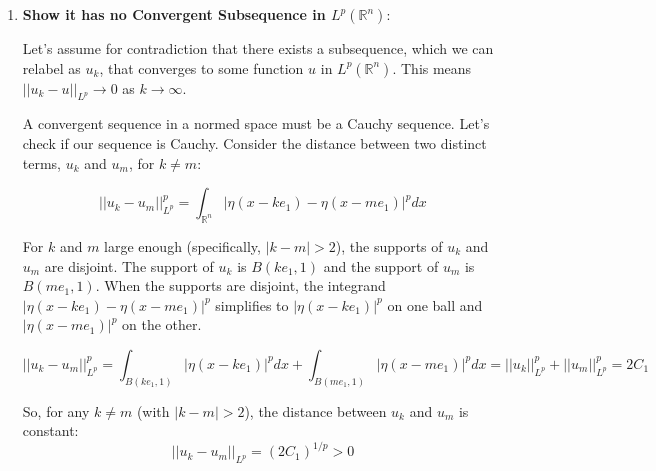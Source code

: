 \documentclass[12pt,a4paper]{report}
\begin{document}
\begin{enumerate}
\begin{enumerate}
\begin{itemize}
    By a simple change of variables $y = x - k e_1$, we see that the norm is independent of the shift:
        $$ ||u_k||_{L^p}^p = \int_{\mathbb{R}^n} |\eta(x - k e_1)|^p dx = \int_{\mathbb{R}^n} |\eta(y)|^p dy = ||\eta||_{L^p}^p $$
        This is a finite constant, let's call it $C_1$.

    \item \textbf{$L^p$ norm of $Du_k$}: 
    
    The derivative is $Du_k(x) = D\eta(x - k e_1)$. Again, by the same change of variables:
        $$ ||Du_k||_{L^p}^p = \int_{\mathbb{R}^n} |D\eta(x - k e_1)|^p dx = \int_{\mathbb{R}^n} |D\eta(y)|^p dy = ||D\eta||_{L^p}^p $$
        This is also a finite constant, let's call it $C_2$.
\end{itemize}

    Therefore, the $W^{1,p}$ norm for any function in the sequence is:
    $$ ||u_k||_{W^{1,p}}^p = C_1 + C_2 $$
    The sequence is not just bounded; every function has the exact same norm. It is clearly a bounded sequence in $W^{1,p}(\mathbb{R}^n)$.

\item \textbf{Show it has no Convergent Subsequence in $L^p(\mathbb{R}^n)$}:

    Let's assume for contradiction that there exists a subsequence, which we can relabel as $u_k$, that converges to some function $u$ in $L^p(\mathbb{R}^n)$. This means $||u_k - u||_{L^p} \to 0$ as $k \to \infty$.

    A convergent sequence in a normed space must be a Cauchy sequence. Let's check if our sequence is Cauchy. Consider the distance between two distinct terms, $u_k$ and $u_m$, for $k \neq m$:

    $$ ||u_k - u_m||_{L^p}^p = \int_{\mathbb{R}^n} |\eta(x - k e_1) - \eta(x - m e_1)|^p dx $$

    For $k$ and $m$ large enough (specifically, $|k-m| > 2$), the supports of $u_k$ and $u_m$ are disjoint. The support of $u_k$ is $B(k e_1, 1)$ and the support of $u_m$ is $B(m e_1, 1)$. When the supports are disjoint, the integrand $|\eta(x - k e_1) - \eta(x - m e_1)|^p$ simplifies to $|\eta(x - k e_1)|^p$ on one ball and $|\eta(x - m e_1)|^p$ on the other.

    $$ ||u_k - u_m||_{L^p}^p = \int_{B(k e_1, 1)} |\eta(x - k e_1)|^p dx + \int_{B(m e_1, 1)} |\eta(x - m e_1)|^p dx = ||u_k||_{L^p}^p + ||u_m||_{L^p}^p = 2 C_1 $$

    So, for any $k \neq m$ (with $|k-m|>2$), the distance between $u_k$ and $u_m$ is constant:
    $$ ||u_k - u_m||_{L^p} = (2C_1)^{1/p} > 0 $$


\end{enumerate}
\end{enumerate}
\end{document}
